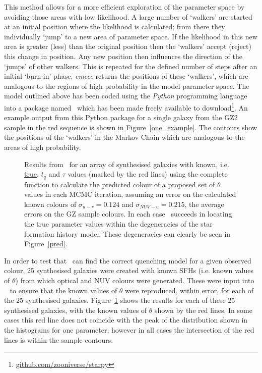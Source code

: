 This method allows for a more efficient exploration of the parameter space by avoiding those areas with low likelihood. A large number of `walkers' are started at an initial position where the likelihood is calculated; from there they individually `jump' to a new area of parameter space. If the likelihood in this new area is greater (less) than the original position then the `walkers' accept (reject) this change in position. Any new position then influences the direction of the  `jumps' of other walkers. This is repeated for the defined number of steps after an initial `burn-in' phase. \emph{emcee} returns the positions of these `walkers', which are analogous to the regions of high probability in the model parameter space. The model outlined above has been coded using the \emph{Python} programming language into a package named \starpy ~which has been made freely available to download\footnote{\url{github.com/zooniverse/starpy}}. An example output from this Python package for a single galaxy from the GZ2 sample in the red sequence is shown in Figure~\ref{one_example}. The contours show the positions of the `walkers' in the Markov Chain which are analogous to the areas of high probability.

\begin{figure}
\caption{Results from \starpy ~for an array of synthesised galaxies with known, i.e. \underline{true}, $t_q$ and $\tau$ values (marked by the red lines) using the complete function to calculate the predicted colour of a proposed set of $\theta$ values in each MCMC iteration, assuming an error on the calculated known colours of $\sigma_{u-r} = 0.124$ and $\sigma_{NUV-u} = 0.215$, the average errors on the GZ sample colours. In each case \starpy ~succeeds in locating the true parameter values within the degeneracies of the star formation history model. These degeneracies can clearly be seen in Figure~\ref{pred}.}
\label{test_mosaic}
\end{figure}

In order to test that \starpy ~can find the correct quenching model for a given observed colour, 25 synthesised galaxies were created with known SFHs (i.e. known values of $\theta$) from which optical and NUV colours were generated. These were input into \starpy ~ to ensure that the known values of $\theta$ were reproduced, within error, for each of the 25 synthesised galaxies. Figure~\ref{test_mosaic} shows the results for each of these 25 synthesised galaxies, with the known values of $\theta$ shown by the red lines. In some cases this red line does not coincide with the peak of the distribution shown in the histograms for one parameter, however in all cases the intersection of the red lines is within the sample contours. 

